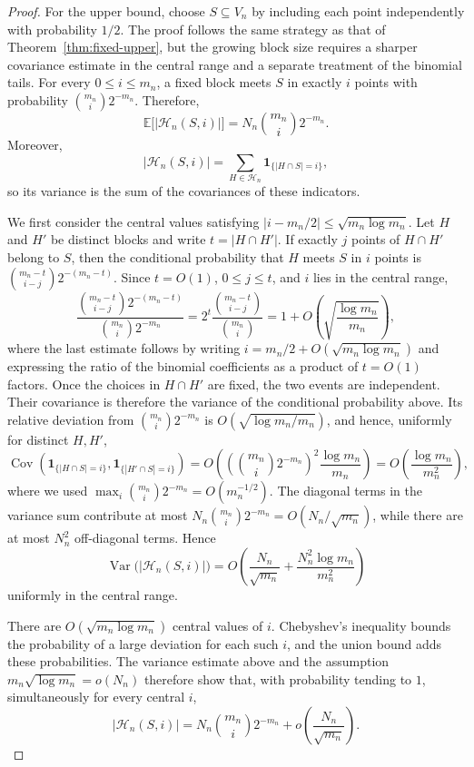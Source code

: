\documentclass[10pt]{article}
\theoremstyle{definition}
\begin{document}
	\begin{proof} For the upper bound, choose \(S\subseteq V_n\) by including each point independently with probability \(1/2\). The proof follows the same strategy as that of Theorem~\ref{thm:fixed-upper}, but the growing block size requires a sharper covariance estimate in the central range and a separate treatment of the binomial tails. For every \(0\leq i\leq m_n\), a fixed block meets \(S\) in exactly \(i\) points with probability \(\binom{m_n}{i}2^{-m_n}\). Therefore,
		\[
		\mathbb E\bigl[|\mathcal H_n(S,i)|\bigr]
		=N_n\binom{m_n}{i}2^{-m_n}.
		\]
		Moreover,
		\[
		|\mathcal H_n(S,i)|
		=\sum_{H\in\mathcal H_n}\mathbf 1_{\{|H\cap S|=i\}},
		\]
		so its variance is the sum of the covariances of these indicators.
		
		We first consider the central values satisfying
		\(\left|i-m_n/2\right|\leq\sqrt{m_n\log m_n}\). Let \(H\) and \(H'\)
		be distinct blocks and write \(t=|H\cap H'|\). If exactly \(j\) points
		of \(H\cap H'\) belong to \(S\), then the conditional probability that
		\(H\) meets \(S\) in \(i\) points is
		\(\binom{m_n-t}{i-j}2^{-(m_n-t)}\). Since \(t=O(1)\),
		\(0\leq j\leq t\), and \(i\) lies in the central range,
		\[
		\frac{\binom{m_n-t}{i-j}2^{-(m_n-t)}}
		{\binom{m_n}{i}2^{-m_n}}
		=
		2^t\frac{\binom{m_n-t}{i-j}}{\binom{m_n}{i}}
		=
		1+O\left(\sqrt{\frac{\log m_n}{m_n}}\right),
		\]
		where the last estimate follows by writing
		\(i=m_n/2+O(\sqrt{m_n\log m_n})\) and expressing the ratio of the
		binomial coefficients as a product of \(t=O(1)\) factors. Once the
		choices in \(H\cap H'\) are fixed, the two events are independent.
		Their covariance is therefore the variance of the conditional probability
		above. Its relative deviation from
		\(\binom{m_n}{i}2^{-m_n}\) is
		\(O(\sqrt{\log m_n/m_n})\), and hence, uniformly for distinct \(H,H'\),
		\[
		\operatorname{Cov}\left(
		\mathbf 1_{\{|H\cap S|=i\}},
		\mathbf 1_{\{|H'\cap S|=i\}}
		\right)
		=
		O\left(
		\left(\binom{m_n}{i}2^{-m_n}\right)^2
		\frac{\log m_n}{m_n}
		\right)
		=
		O\left(\frac{\log m_n}{m_n^2}\right),
		\]
		where we used
		\(\max_i\binom{m_n}{i}2^{-m_n}=O(m_n^{-1/2})\). The diagonal terms in the variance sum contribute at most \(N_n\binom{m_n}{i}2^{-m_n}=O(N_n/\sqrt{m_n})\), while there are at most \(N_n^2\) off-diagonal terms. Hence
		\[
		\operatorname{Var}\bigl(|\mathcal H_n(S,i)|\bigr)
		=
		O\left(
		\frac{N_n}{\sqrt{m_n}}
		+\frac{N_n^2\log m_n}{m_n^2}
		\right)
		\]
		uniformly in the central range.
		
		There are \(O(\sqrt{m_n\log m_n})\) central values of \(i\). Chebyshev's inequality bounds the probability of a large deviation for each such \(i\), and the union bound adds these probabilities. The variance estimate above and the assumption \(m_n\sqrt{\log m_n}=o(N_n)\) therefore show that, with probability tending to \(1\), simultaneously for every central \(i\),
		\[
		|\mathcal H_n(S,i)|
		=
		N_n\binom{m_n}{i}2^{-m_n}
		+o\left(\frac{N_n}{\sqrt{m_n}}\right).
		\]
		

\end{proof}
\end{document}
